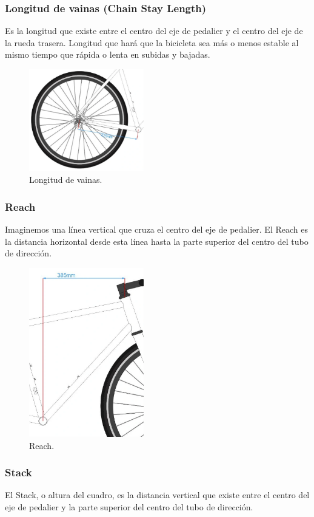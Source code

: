 \documentclass{article}
\begin{document}
\subsubsection{Longitud de vainas (Chain Stay Length)}
Es la longitud que existe entre el centro del eje de pedalier y el centro del eje de la rueda trasera. Longitud que hará que la bicicleta sea más o menos estable al mismo tiempo que rápida o lenta en subidas y bajadas.
\begin{figure} [htp]%
    \centering
    \includegraphics[width=50mm]{Imagen9.png} %
    \caption{Longitud de vainas.}
    \label{grafica}
\end{figure}

\subsubsection{Reach}
Imaginemos una línea vertical que cruza el centro del eje de pedalier. El Reach es la distancia horizontal desde esta línea hasta la parte superior del centro del tubo de dirección.
\begin{figure} [htp]%
    \centering
    \includegraphics[width=50mm]{Imagen10.png} %
    \caption{Reach.}
    \label{grafica}
\end{figure}

\subsubsection{Stack}
El Stack, o altura del cuadro, es la distancia vertical que existe entre el centro del eje de pedalier y la parte superior del centro del tubo de dirección.
\end{document}
